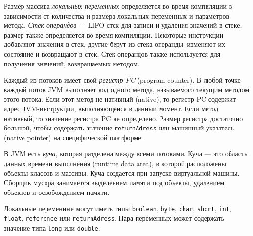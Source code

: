 Размер массива \textit{локальных переменных} определяется во время компиляции в зависимости от количества и размера локальных переменных и параметров метода. \textit{Стек операндов} --- LIFO-стек для записи и удаления значений в стеке; размер также определяется во время компиляции. Некоторые инструкции добавляют значения в стек, другие берут из стека операнды, изменяют их состояние и возвращают в стек. Стек операндов также используется для получения значений, возвращаемых методом. 

Каждый из потоков имеет свой \textit{регистр PC} (program counter). В любой точке каждый поток JVM выполняет код одного метода, называемого текущим методом этого потока. Если этот метод не нативный (native), то регистр PC содержит адрес JVM-инструкции, выполняющейся в данный момент. Если метод нативный, то значение регистра PC не определено. Размер регистра достаточно большой, чтобы содержать значение \texttt{returnAdress} или машинный указатель (native pointer) на специфической платформе.

В JVM есть \textit{куча}, которая разделена между всеми потоками. Куча --- это область данных времени выполнения (runtime data area), в которой расположены объекты классов и массивы. Куча создается при запуске виртуальной машины. Сборщик мусора занимается выделением памяти под объекты, удалением объектов и освобождением памяти.

Локальные переменные могут иметь типы \texttt{boolean}, \texttt{byte}, \texttt{char}, \texttt{short}, \texttt{int}, \texttt{float}, \texttt{reference} или \texttt{returnAdress}. Пара переменных может содержать значение типа \texttt{long} или \texttt{double}.



